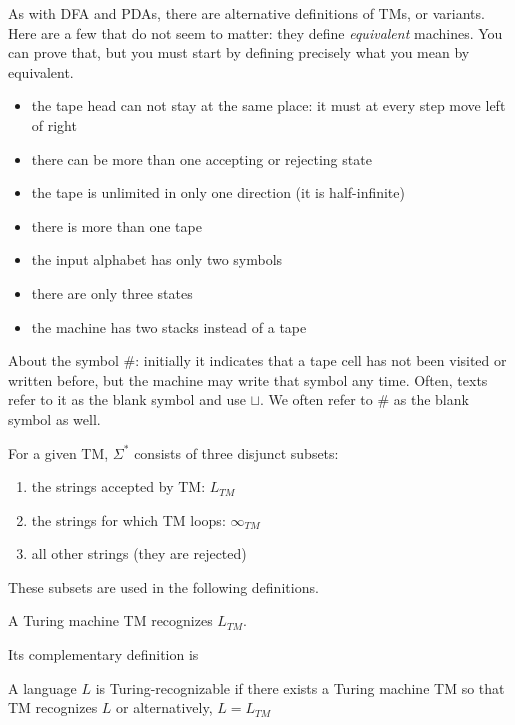 As with DFA and PDAs, there are alternative definitions of TMs, or
variants. Here are a few that do not seem to matter: they define {\em
  equivalent} machines. You can prove that, but you must start by
defining precisely what you mean by equivalent.

\begin{itemize}
\item the tape head can not stay at the same place: it must at every step move left of right
\item there can be more than one accepting or rejecting state
\item the tape is unlimited in only one direction (it is half-infinite)
\item there is more than one tape
\item the input alphabet has only two symbols\label{twosymbols}
\item there are only three states
\item the machine has two stacks instead of a tape
\end{itemize}

About the symbol \#: initially it indicates that a tape cell has not
been visited or written before, but the machine may write that symbol
any time. Often, texts refer to it as the blank symbol and use
$\sqcup$. We often refer to \# as the blank symbol as well.


For a given TM, $\Sigma^*$ consists of three disjunct subsets:
\begin{enumerate}
\item the strings accepted by TM: $L_{TM}$
\item the strings for which TM loops: $\infty_{TM}$
\item all other strings (they are rejected)
\end{enumerate}
These subsets are used in the following definitions.



\begin{definition}[To recognize]
A Turing machine TM recognizes $L_{TM}$.
\end{definition}

Its complementary definition is

\begin{definition}
A language $L$ is Turing-recognizable if there exists a Turing machine
TM so that TM recognizes $L$ or alternatively, $L = L_{TM}$
\end{definition}

